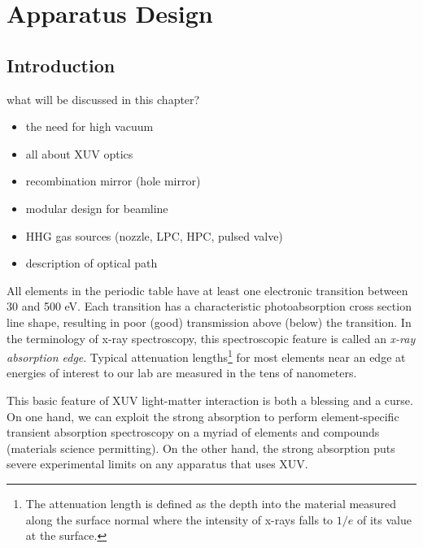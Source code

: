 \chapter{Apparatus Design}

\section{Introduction}
what will be discussed in this chapter?
\begin{itemize}
	\item the need for high vacuum
	\item all about XUV optics
	\item recombination mirror (hole mirror)
	\item modular design for beamline
	\item HHG gas sources (nozzle, LPC, HPC, pulsed valve)
	\item description of optical path
\end{itemize}


All elements in the periodic table have at least one electronic transition between 30 and 500 eV. Each transition has a characteristic photoabsorption cross section line shape, resulting in poor (good) transmission above (below) the transition. In the terminology of x-ray spectroscopy, this spectroscopic feature is called an \textit{x-ray absorption edge}. Typical attenuation lengths\footnote{The attenuation length is defined as the depth into the material measured along the surface normal where the intensity of x-rays falls to $1/e$ of its value at the surface.} for most elements near an edge at energies of interest to our lab are measured in the tens of nanometers.

This basic feature of XUV light-matter interaction is both a blessing and a curse. On one hand, we can exploit the strong absorption to perform element-specific transient absorption spectroscopy on a myriad of elements and compounds (materials science permitting). On the other hand, the strong absorption puts severe experimental limits on any apparatus that uses XUV.

